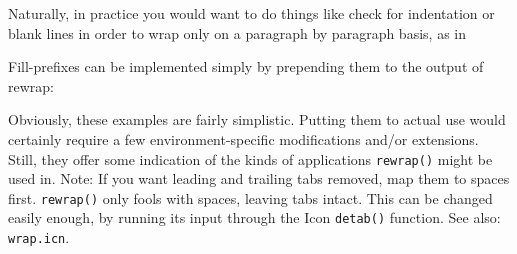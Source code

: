 Naturally, in practice you would want to do things like check for
indentation or blank lines in order to wrap only on a paragraph by
paragraph basis, as in


\noindent Fill-prefixes can be implemented simply by prepending them
to the output of rewrap:


Obviously, these examples are fairly simplistic. Putting them to actual
use would certainly require a few environment-specific modifications
and/or extensions. Still, they offer some indication of the kinds of
applications \texttt{rewrap()} might be used in. Note: If you want
leading and trailing tabs removed, map them to spaces first.
\texttt{rewrap()} only fools with spaces, leaving tabs intact. This can
be changed easily enough, by running its input through the Icon
\texttt{detab()} function.
See also: \texttt{wrap.icn}.

